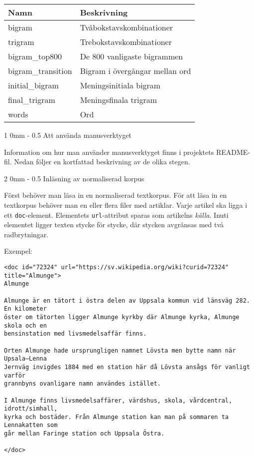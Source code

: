 \documentclass[11pt, a4paper, twoside]{article}
\makeatletter
\renewcommand{\subsection}{\@startsection
  {subsection}%
  {2}%
  {0mm}%
  {-\baselineskip}%
  {0.5\baselineskip}%
  {\bfseries\sffamily\large}}%
\renewcommand{\section}{\@startsection
  {section}%
  {1}%
  {0mm}%
  {-\baselineskip}%
  {0.5\baselineskip}%
  {\bfseries\sffamily\Large}}%
\makeatother
\begin{document}
\begin{tabular}{ll}
  \bf Namn & \bf Beskrivning\\\hline
  bigram & Tvåbokstavskombinationer\\
  trigram & Trebokstavskombinationer\\
  bigram\_top800 & De 800 vanligaste bigrammen\\
  bigram\_transition & Bigram i övergångar mellan ord\\
  initial\_bigram & Meningsinitiala bigram\\
  final\_trigram & Meningsfinala trigram\\
  words & Ord 
\end{tabular}

\section{Att använda manusverktyget}

Information om hur man använder manusverktyget finns i projektets README-fil. Nedan följer en kortfattad beskrivning av de olika stegen.


\subsection{Inläsning av normaliserad korpus}

Först behöver man läsa in en normaliserad textkorpus. För att läsa in en textkorpus behöver man en eller flera filer med artiklar. Varje artikel ska ligga i ett {\tt doc}-element. Elementets {\tt url}-attribut sparas som artikelns {\em källa}. Inuti elementet ligger texten stycke för stycke, där stycken avgränsas med två radbrytningar.

Exempel:
\begin{verbatim}
<doc id="72324" url="https://sv.wikipedia.org/wiki?curid=72324" title="Almunge">
Almunge

Almunge är en tätort i östra delen av Uppsala kommun vid länsväg 282. En kilometer
öster om tätorten ligger Almunge kyrkby där Almunge kyrka, Almunge skola och en
bensinstation med livsmedelsaffär finns.

Orten Almunge hade ursprungligen namnet Lövsta men bytte namn när Upsala–Lenna
Jernväg invigdes 1884 med en station här då Lövsta ansågs för vanligt varför
grannbyns ovanligare namn användes istället.

I Almunge finns livsmedelsaffärer, värdshus, skola, vårdcentral, idrott/simhall,
kyrka och bostäder. Från Almunge station kan man på sommaren ta Lennakatten som
går mellan Faringe station och Uppsala Östra.

</doc>
\end{verbatim}
\end{document}
